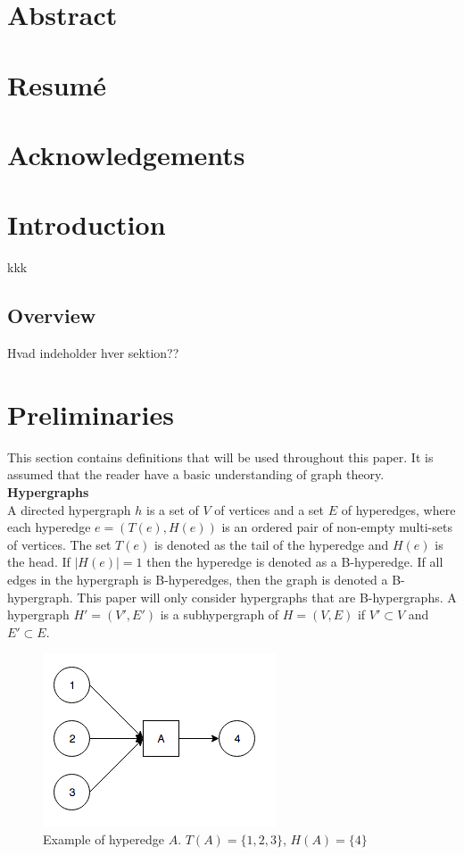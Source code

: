 \documentclass[a4paper,10pt,titlepage]{paper}
\begin{document}
\begin{titlepage}
\end{titlepage}

\vfill
\section*{Abstract}

\section*{Resumé}
\newpage

\tableofcontents
\newpage


\section{Acknowledgements}

\section{Introduction}
kkk \cite{Grzybowski}\\
\subsection{Overview}
Hvad indeholder hver sektion??

\section{Preliminaries}

This section contains definitions that will be used throughout this paper. It is assumed that the reader have a basic understanding of graph theory. \\

\textbf{Hypergraphs}\\
A directed hypergraph $h$ is a set of $V$ of vertices and a set $E$ of hyperedges, where each hyperedge $e=(T(e),H(e))$ is an ordered pair of non-empty multi-sets of vertices. The set $T(e)$ is denoted as the tail of the hyperedge and $H(e)$ is the head. If $|H(e)|=1$ then the hyperedge is denoted as a B-hyperedge. If all edges in the hypergraph is B-hyperedges, then the graph is denoted a B-hypergraph. This paper will only consider hypergraphs that are B-hypergraphs. A hypergraph $H' = (V',E')$ is a subhypergraph of $H=(V,E)$ if $V' \subset V$ and $E'\subset E$.\cite{Fagerberg}

\begin{figure}[H]
\centering
\includegraphics[scale=0.5]{Billeder/HyperEdge.png}
\caption{Example of hyperedge $A$. $T(A) = \{1,2,3\}$, $H(A) = \{4\}$}
\end{figure}
\end{document}
